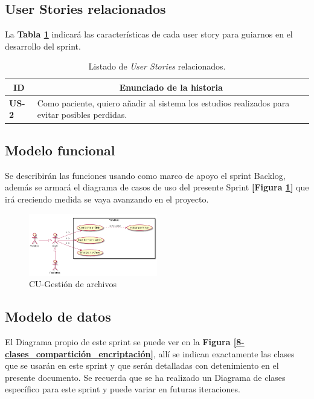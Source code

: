 \subsection{User Stories relacionados}
La \textbf{Tabla \ref{US-Sprint8}} indicará las características de cada user story para guiarnos en el desarrollo del sprint.
\begin{table}[h]
    \centering
	\begin{tabular}{|l|p{9cm}|}
	\hline
        \multicolumn{1}{|c|}{\textbf{ID}} &
        \multicolumn{1}{|c|}{\textbf{Enunciado de la historia}} \\          
    \hline
        \textbf{US-2 } & Como paciente, quiero añadir al sistema los estudios realizados para evitar posibles perdidas.\\
     \hline 
     
    \end{tabular}
    \caption{Listado de \textit{User Stories} relacionados.}
    \label{US-Sprint8}
\end{table}

\subsection{Modelo funcional} 
Se describirán las funciones usando como marco de apoyo el sprint Backlog, además se armará el diagrama de casos de uso del presente Sprint \textbf{[Figura \ref{8-cu_compartición_encriptación}]} que irá creciendo  medida se vaya avanzando en el proyecto.

    \begin{figure}[h]
        \centering
        \includegraphics[width=0.5\textwidth]{img/dcu_sprint8}
        \caption{CU-Gestión de archivos}
		\label{8-cu_compartición_encriptación}
    \end{figure}


\subsection{Modelo de datos}
El Diagrama propio de este sprint se puede ver en la \textbf{Figura \ref{8-clases_compartición_encriptación}}, allí se indican exactamente las clases que se usarán en este sprint y que serán detalladas con detenimiento en el presente documento. Se recuerda que se ha realizado un Diagrama de clases específico para este sprint y puede variar en futuras iteraciones.

